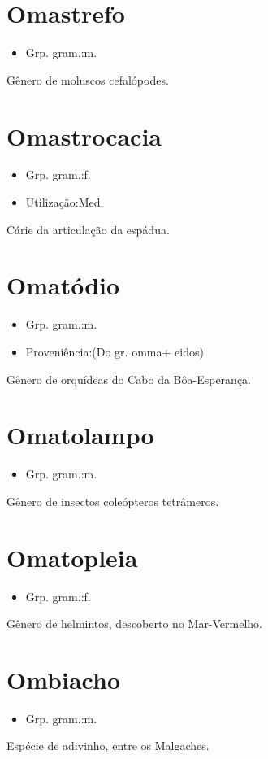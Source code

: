 \section{Omastrefo}
\begin{itemize}
\item {Grp. gram.:m.}
\end{itemize}
Gênero de moluscos cefalópodes.
\section{Omastrocacia}
\begin{itemize}
\item {Grp. gram.:f.}
\end{itemize}
\begin{itemize}
\item {Utilização:Med.}
\end{itemize}
Cárie da articulação da espádua.
\section{Omatódio}
\begin{itemize}
\item {Grp. gram.:m.}
\end{itemize}
\begin{itemize}
\item {Proveniência:(Do gr. \textunderscore omma\textunderscore  + \textunderscore eidos\textunderscore )}
\end{itemize}
Gênero de orquídeas do Cabo da Bôa-Esperança.
\section{Omatolampo}
\begin{itemize}
\item {Grp. gram.:m.}
\end{itemize}
Gênero de insectos coleópteros tetrâmeros.
\section{Omatopleia}
\begin{itemize}
\item {Grp. gram.:f.}
\end{itemize}
Gênero de helmintos, descoberto no Mar-Vermelho.
\section{Ombiacho}
\begin{itemize}
\item {Grp. gram.:m.}
\end{itemize}
Espécie de adivinho, entre os Malgaches.
